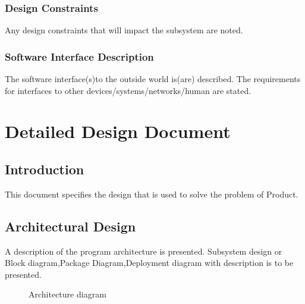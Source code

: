 \documentclass[oneside,a4paper,12pt]{report}
\begin{document}
 \subsection{Design Constraints}
Any design constraints that will impact the subsystem are noted.
 \subsection{Software Interface Description}
The software interface(s)to the outside world is(are) described.
The requirements for interfaces to other devices/systems/networks/human are stated.



\chapter{Detailed Design Document }
 \section{Introduction}
This document specifies the design that is used to solve the problem of Product.
\section{Architectural Design}
	A description of the program architecture is presented. Subsystem design or Block diagram,Package Diagram,Deployment diagram with description is to be presented.


  \begin{center}
	\begin{figure}[!htbp]
		\centering
	  \caption{Architecture diagram}
	  \label{fig:arch-dig}
	\end{figure}
\end{center}
\end{document}
